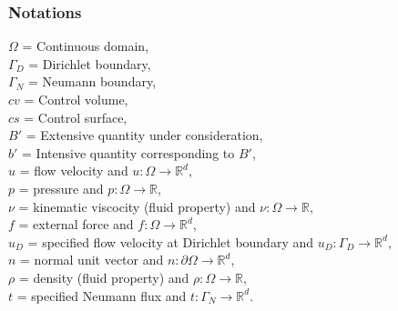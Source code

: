\documentclass{beamer}
\begin{document}
\begin{frame}
\frametitle{Notations}
$\Omega$ = Continuous domain,\\
$\Gamma_D$ = Dirichlet boundary, \\
$\Gamma_N$ = Neumann boundary, \\
$cv$ = Control volume,\\
$cs$ = Control surface,\\
$B'$ = Extensive quantity under consideration,\\
$b'$ = Intensive quantity corresponding to $B'$,\\
$u$ = flow velocity and $u:\Omega \rightarrow \mathbb{R}^d$,\\
$p$ = pressure and $p:\Omega \rightarrow \mathbb{R}$,\\
$\nu$ = kinematic viscocity (fluid property) and $\nu:\Omega \rightarrow \mathbb{R}$,\\ 
$f$ = external force and $f:\Omega \rightarrow \mathbb{R}^d$,\\
$u_D$ = specified flow velocity at Dirichlet boundary and $u_D:\Gamma_D \rightarrow \mathbb{R}^d$,\\
$n$ = normal unit vector and $n:\partial \Omega \rightarrow \mathbb{R}^d$,\\
$\rho$ = density (fluid property) and $\rho:\Omega \rightarrow \mathbb{R}$,\\
$t$ = specified Neumann flux and $t:\Gamma_N \rightarrow \mathbb{R}^d$.\\
\end{frame}
\end{document}
